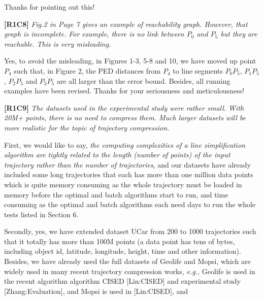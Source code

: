 \documentclass{letter}
\newcommand{\kw}[1]{{\ensuremath {\mathsf{#1}}}\xspace}
\newcommand{\ie}{\emph{i.e.,}\xspace}
\newcommand{\eg}{\emph{e.g.,}\xspace}
\begin{document}
{Thanks for pointing out this!


\textbf{[R1C8]} \emph{ Fig.2 in Page 7 gives an example of reachability graph. However, that graph is incomplete. For example, there is no link between $P_0$ and $P_5$ but they are reachable. This is very misleading. }

Yes, to avoid the misleading, in Figures 1-3, 5-8 and 10, we have moved up point $P_4$ such that, in Figure 2, the PED distances from $P_4$ to line segments $\overline{P_0P_5}$, $\overline{P_1P_5}$, $\overline{P_2P_5}$ and $\overline{P_3P_5}$ are all larger than the error bound. Besides, all running examples have been revised.
Thanks for your seriousness and meticulousness!






\textbf{[R1C9]} \emph{ The datasets used in the experimental study were rather small. With 20M+ points, there is no need to compress them. Much larger datasets will be more realistic for the topic of trajectory compression.  }

First, we would like to say, \emph{the computing complexities of a line simplification algorithm are tightly related to the length (number of points) of the input trajectory rather than the number of trajectories}, and our datasets have already included some long trajectories that each has more than {one million} data points which is quite memory consuming as the whole trajectory must be loaded in memory before the optimal and batch algorithms start to run, and time consuming as the optimal and batch algorithms each need {days} to run the whole tests listed in Section 6.

Secondly, yes, we have extended dataset UCar from 200 to 1000 trajectories such that it totally has more than {100M} points (a data point has tens of bytes, including object id, latitude, longitude, height, time and other information). Besides, we have already used the full datasets of Geolife and Mopsi, which are widely used in many recent trajectory compression works, \eg Geolife is used in the recent algorithm algorithm CISED [Lin:CISED] and experimental study [Zhang:Evaluation], and Mopsi is used in [Lin:CISED], and  %

}
\end{document}
